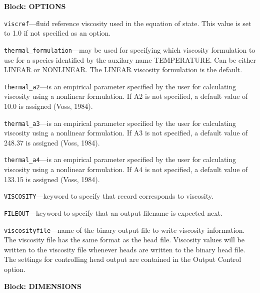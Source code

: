 
\item \textbf{Block: OPTIONS}

\begin{description}
\item \texttt{viscref}---fluid reference viscosity used in the equation of state.  This value is set to 1.0 if not specified as an option.

\item \texttt{thermal\_formulation}---may be used for specifying which viscosity formulation to use for a species identified by the auxilary name TEMPERATURE. Can be either LINEAR or NONLINEAR. The LINEAR viscosity formulation is the default.

\item \texttt{thermal\_a2}---is an empirical parameter specified by the user for calculating viscosity using a nonlinear formulation.  If A2 is not specified, a default value of 10.0 is assigned (Voss, 1984).

\item \texttt{thermal\_a3}---is an empirical parameter specified by the user for calculating viscosity using a nonlinear formulation.  If A3 is not specified, a default value of 248.37 is assigned (Voss, 1984).

\item \texttt{thermal\_a4}---is an empirical parameter specified by the user for calculating viscosity using a nonlinear formulation.  If A4 is not specified, a default value of 133.15 is assigned (Voss, 1984).

\item \texttt{VISCOSITY}---keyword to specify that record corresponds to viscosity.

\item \texttt{FILEOUT}---keyword to specify that an output filename is expected next.

\item \texttt{viscosityfile}---name of the binary output file to write viscosity information.  The viscosity file has the same format as the head file.  Viscosity values will be written to the viscosity file whenever heads are written to the binary head file.  The settings for controlling head output are contained in the Output Control option.

\end{description}
\item \textbf{Block: DIMENSIONS}

